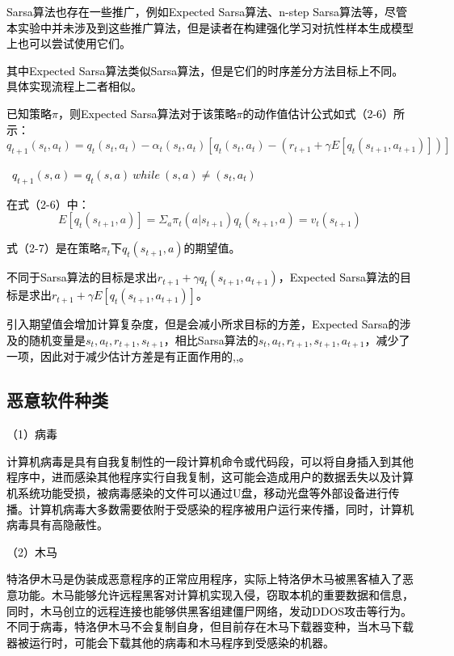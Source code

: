 \textcolor{black}{Sarsa算法也存在一些推广，例如Expected Sarsa算法、n-step Sarsa算法等，尽管本实验中并未涉及到这些推广算法，但是读者在构建强化学习对抗性样本生成模型上也可以尝试使用它们。}

\textcolor{black}{其中Expected Sarsa算法类似Sarsa算法，但是它们的时序差分方法目标上不同。具体实现流程上二者相似。}

\textcolor{black}{已知策略$\pi$，则Expected Sarsa算法对于该策略$\pi$的动作值估计公式如式（2-6）所示：}
\begin{equation}
q_{t+1}(s_{t},a_{t})=q_{t}(s_{t},a_{t})-\alpha _{t}(s_{t},a_{t})[q_{t}(s_{t},a_{t})-(r_{t+1}+\gamma E[q_{t}(s_{t+1},a_{t+1})])] 
\end{equation}

\textcolor{black}{\ $q_{t+1}(s,a)=q_{t}(s,a) \ while \ (s,a) \neq (s_{t},a_{t})$}

\textcolor{black}{在式（2-6）中：}
\begin{equation}
    E[q_{t}(s_{t+1},a)]=\Sigma_{a}\pi_{t}(a|s_{t+1})q_{t}(s_{t+1},a)=v_{t}(s_{t+1})
\end{equation}

\textcolor{black}{式（2-7）是在策略${\pi}_{t}$下${q}_{t}\left({s}_{{t+1}}{,a} \right)$的期望值。}

\textcolor{black}{不同于Sarsa算法的目标是求出$r_{t+1}+\gamma q_{t}(s_{t+1},a_{t+1})$，Expected Sarsa算法的目标是求出$r_{t+1}+\gamma E[q_{t}(s_{t+1},a_{t+1})]$。}

\textcolor{black}{引入期望值会增加计算复杂度，但是会减小所求目标的方差，Expected Sarsa的涉及的随机变量是${{s}_{t}{,}a_t,r_{t+1},s_{t+1}}$，相比Sarsa算法的${s_t,a_t,r_{t+1},s_{t+1},a_{t+1}}$，减少了一项，因此对于减少估计方差是有正面作用的\parencite{ref30},\parencite{ref31},\parencite{ref32}。}

\subsection{恶意软件种类}

\textcolor{black}{（1）病毒}

\textcolor{black}{计算机病毒是具有自我复制性的一段计算机命令或代码段，可以将自身插入到其他程序中，进而感染其他程序实行自我复制，这可能会造成用户的数据丢失以及计算机系统功能受损，被病毒感染的文件可以通过U盘，移动光盘等外部设备进行传播。计算机病毒大多数需要依附于受感染的程序被用户运行来传播，同时，计算机病毒具有高隐蔽性。}

\textcolor{black}{（2）木马}

\textcolor{black}{特洛伊木马是伪装成恶意程序的正常应用程序，实际上特洛伊木马被黑客植入了恶意功能。木马能够允许远程黑客对计算机实现入侵，窃取本机的重要数据和信息，同时，木马创立的远程连接也能够供黑客组建僵尸网络，发动DDOS攻击等行为。不同于病毒，特洛伊木马不会复制自身，但目前存在木马下载器变种，当木马下载器被运行时，可能会下载其他的病毒和木马程序到受感染的机器。}

